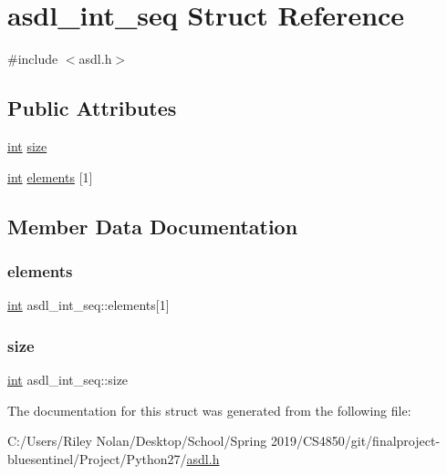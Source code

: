 \hypertarget{structasdl__int__seq}{}\section{asdl\+\_\+int\+\_\+seq Struct Reference}
\label{structasdl__int__seq}


{\ttfamily \#include $<$asdl.\+h$>$}

\subsection*{Public Attributes}
\begin{DoxyCompactItemize}
\item 
\mbox{\hyperlink{warnings_8h_a74f207b5aa4ba51c3a2ad59b219a423b}{int}} \mbox{\hyperlink{structasdl__int__seq_afbb554482e112e8170ad046addf0768b}{size}}
\item 
\mbox{\hyperlink{warnings_8h_a74f207b5aa4ba51c3a2ad59b219a423b}{int}} \mbox{\hyperlink{structasdl__int__seq_ae8d9dcdc0b90d0f395c650783adb095f}{elements}} \mbox{[}1\mbox{]}
\end{DoxyCompactItemize}


\subsection{Member Data Documentation}
\mbox{\label{structasdl__int__seq_ae8d9dcdc0b90d0f395c650783adb095f}} 
\subsubsection{\texorpdfstring{elements}{elements}}
{\footnotesize\ttfamily \mbox{\hyperlink{warnings_8h_a74f207b5aa4ba51c3a2ad59b219a423b}{int}} asdl\+\_\+int\+\_\+seq\+::elements\mbox{[}1\mbox{]}}

\mbox{\label{structasdl__int__seq_afbb554482e112e8170ad046addf0768b}} 
\subsubsection{\texorpdfstring{size}{size}}
{\footnotesize\ttfamily \mbox{\hyperlink{warnings_8h_a74f207b5aa4ba51c3a2ad59b219a423b}{int}} asdl\+\_\+int\+\_\+seq\+::size}



The documentation for this struct was generated from the following file\+:\begin{DoxyCompactItemize}
\item 
C\+:/\+Users/\+Riley Nolan/\+Desktop/\+School/\+Spring 2019/\+C\+S4850/git/finalproject-\/bluesentinel/\+Project/\+Python27/\mbox{\hyperlink{asdl_8h}{asdl.\+h}}\end{DoxyCompactItemize}
